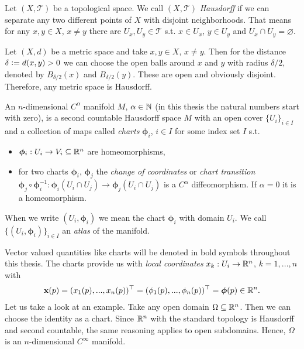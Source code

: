 \documentclass[../master_thesis.tex]{subfiles}
\begin{document}
\begin{definition}
    Let $(X, \mathcal{T})$ be a topological space. We call $(X, \mathcal{T})$
    \textit{Hausdorff} if we can separate any two different points of $X$
    with disjoint neighborhoods. That means for any $x,y \in X$, 
    $x\neq y$ there are $U_x, U_y \in \mathcal{T}$ s.t. 
    $x \in U_x$, $y \in U_y$ and $U_x \cap U_y = \varnothing$.
\end{definition}

\begin{example}
    Let $(X,d)$ be a metric space and take 
    $x,y \in X$, $x\neq y$. Then for the distance 
    $\delta \vcentcolon= d(x,y) > 0$ we can choose the open balls around $x$ and 
    $y$ with radius 
    $\delta/2$, denoted by $B_{\delta/2}(x)$ and $B_{\delta/2}(y)$. These are 
    open and obviously disjoint. Therefore, any metric space is Hausdorff. 
\end{example}

\begin{definition}[Manifold]
    An $n$-dimensional $C^\alpha$ manifold $M$, $\alpha \in \mathbb{N}$ (in this thesis 
    the natural numbers start with zero), 
    is a second countable Hausdorff 
    space $M$ with an open cover $\{ U_i \} _{i\in I}$
    and a collection of maps called \textit{charts} $\boldsymbol{\phi}_i$, $i\in I$ for 
    some index set $I$ s.t.
    \begin{itemize}
        \item $\boldsymbol{\phi}_i: U_i \rightarrow V_i \subseteq \mathbb{R}^{n}$
            are homeomorphisms,
        \item for two charts $\boldsymbol{\phi}_i$, $\boldsymbol{\phi}_j$ the 
            \textit{change of coordinates} or 
            \textit{chart transition} $\boldsymbol{\phi}_j \circ \boldsymbol{\phi}_i^{-1}: 
            \boldsymbol{\phi}_i(U_i \cap U_j) \rightarrow \boldsymbol{\phi}_j(U_i \cap U_j)$ 
            is a $C^\alpha$ diffeomorphism. If $\alpha=0$ it is a homeomorphism.
    \end{itemize}
    When we write $(U_i, \bm{\phi}_i)$ we mean the chart $\bm{\phi}_i$ with domain $U_i$.
    We call $\{ (U_i, \bm{\phi}_i) \}_{i \in I}$ an \textit{atlas} of the manifold.
\end{definition}
Vector valued quantities like charts will be denoted in bold symbols throughout this thesis.
The charts provide us with \textit{local coordinates} $x_k: U_i \rightarrow \mathbb{R}^n$,
$k = 1, ..., n$ with 
\begin{align*}
    \mathbf{x}(p) = (x_1(p),...,x_n(p))^\top 
    = (\phi_1(p),...,\phi_n(p))^\top = \boldsymbol{\phi}(p) \in \mathbb{R}^n.
\end{align*}
Let us take a look at an example. Take any open domain 
$\Omega \subseteq \mathbb{R}^n$. Then we can choose the identity as a chart.
Since $\mathbb{R}^n$ with the standard topology is Hausdorff and second countable,
the same reasoning applies to open subdomains. Hence, $\Omega$ is an 
$n$-dimensional $C^\infty$ manifold. 
\end{document}
